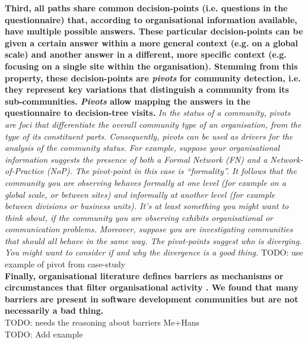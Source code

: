 \documentclass[conference]{IEEEtran}
\begin{document}
{\bf Third, all paths share common decision-points (i.e. questions in the questionnaire) that, according to organisational information available, have multiple possible answers. These particular decision-points can be given a certain answer within a more general context (e.g. on a global scale) and another answer in a different, more specific context (e.g. focusing on a single site within the organisation). Stemming from this property, these decision-points are \emph{pivots} for community detection, i.e. they represent key variations that distinguish a community from its sub-communities. \emph{Pivots} allow mapping the answers in the questionnaire to decision-tree visits.}
\emph{In the status of a community, pivots are foci that differentiate the overall community type of an organisation, from the type of its constituent parts. Consequently, pivots can be used as drivers for the analysis of the community status. For example, suppose your organisational information suggests the presence of both a Formal Network (FN) and a Network-of-Practice (NoP). The pivot-point in this case is ``formality''. It follows that the community you are observing behaves formally at one level (for example on a global scale, or between sites) and informally at another level (for example between divisions or business units). It's at least something you might want to think about, if the community you are observing exhibits organisational or communication problems. Moreover, suppose you are investigating communities that should all behave in the same way. The pivot-points suggest who is diverging. You might want to consider if and why the divergence is a good thing.}
TODO: use example of pivot from case-study\\

{\bf Finally, organisational literature defines barriers as mechanisms or circumstances that filter organisational activity \cite{Correia2010}. We found that many barriers are present in software development communities but are not necessarily a bad thing.}\\
TODO: needs the reasoning about barriers Me+Hans \\
TODO: Add example\\
\end{document}
